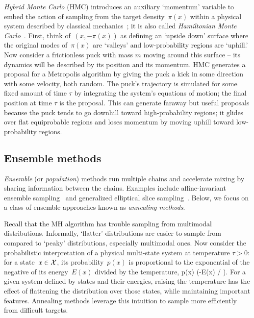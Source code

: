 \documentclass[angelino.tex]{subfiles}
\begin{document}
\emph{Hybrid Monte Carlo} (HMC) introduces an auxiliary `momentum' variable
to embed the action of sampling from the target density~$\pi(x)$ within a
physical system  described by classical mechanics~\citep{duane:1987-hmc};
it is also called \emph{Hamiltonian Monte Carlo}~\citep{neal:2010-hmc}.
First, think of~$(x, -\pi(x))$ as defining an `upside down' surface where the
original modes of~$\pi(x)$ are `valleys' and low-probability regions are
`uphill.'
Now consider a frictionless puck with mass $m$ moving around this surface --
its dynamics will be described by its position and its momentum.
HMC generates a proposal for a Metropolis algorithm by giving the puck a kick
in some direction with some velocity, both random.
The puck's trajectory is simulated for some fixed amount of time $\tau$ by
integrating the system's equations of motion; the final position at time $\tau$
is the proposal.
This can generate faraway but useful proposals because the puck
tends to go downhill toward high-probability regions;
it glides over flat equiprobable regions and loses momentum by moving
uphill toward low-probability regions.


\subsection{Ensemble methods}
\label{sec:ensemble}

\emph{Ensemble} (or \emph{population}) methods run multiple chains and
accelerate mixing by sharing information between the chains.
Examples include affine-invariant ensemble
sampling~\citep{goodman-2010-ensemble} and
generalized elliptical slice sampling~\citep{nishihara-2014-gess}.
Below, we focus on a class of ensemble approaches known as
\emph{annealing methods}.

Recall that the MH algorithm has trouble sampling from multimodal distributions.
Informally, `flatter' distributions are easier to sample from compared to
`peaky' distributions, especially multimodal ones.
Now consider the probabilistic interpretation of a physical
multi-state system at temperature $\tau > 0$: for a state~$x \in {\mathcal X}$,
its probability~$p(x)$ is proportional to the exponential of the negative of
its energy~$E(x)$ divided by the temperature, \ie
\be
p(x) \propto \exp(-E(x) / \tau). \label{energy}
\ee
For a given system defined by states and their energies, raising the temperature
has the effect of flattening the distribution over those states, while
maintaining important features.
Annealing methods leverage this intuition to sample
more efficiently from difficult targets.
\end{document}

